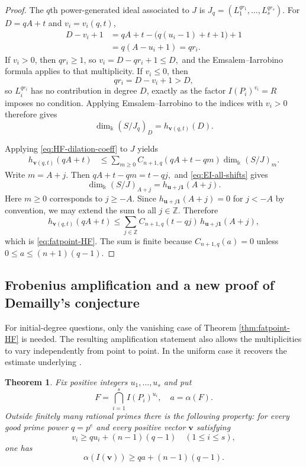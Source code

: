 \documentclass[11pt]{amsart}
\newtheorem{theorem}{Theorem}[section]
\theoremstyle{remark}
\newcommand{\kk}{\Bbbk}
\newcommand{\ZZ}{\mathbb Z}
\begin{document}
\begin{proof}
The $q$th power-generated ideal associated to $J$ is
$
J_q=(L_1^{qr_1},\ldots,L_s^{qr_s}).
$
For $D=qA+t$ and $v_i=v_i(q,t)$,
$$
\begin{aligned}
D-v_i+1
&=qA+t-\bigl(q(u_i-1)+t+1\bigr)+1\\
&=q(A-u_i+1) =qr_i.
\end{aligned}
$$
If $v_i>0$, then $qr_i\ge1$, so
$
v_i=D-qr_i+1\le D,
$
and the Emsalem--Iarrobino formula applies to that multiplicity. If $v_i\le0$, then
$$
qr_i=D-v_i+1>D,
$$
so $L_i^{qr_i}$ has no contribution in degree $D$, exactly as the factor $I(P_i)^{v_i}=R$ imposes no condition. Applying Emsalem--Iarrobino to the indices with $v_i>0$ therefore gives
$$
\dim_{\kk}(S/J_q)_D=h_{\mathbf v(q,t)}(D).
$$

Applying \eqref{eq:HF-dilation-coeff} to $J$ yields
$$
\begin{aligned}
h_{\mathbf v(q,t)}(qA+t)
&\le
\sum_{m\ge0}C_{n+1,q}(qA+t-qm)\dim_{\kk}(S/J)_m.
\end{aligned}
$$
Write $m=A+j$. Then
$
qA+t-qm=t-qj,
$
and \eqref{eq:EI-all-shifts} gives
$$
\dim_{\kk}(S/J)_{A+j}=h_{\mathbf u+j\mathbf1}(A+j).
$$
Here $m\ge0$ corresponds to $j\ge-A$. Since $h_{\mathbf u+j\mathbf1}(A+j)=0$ for $j<-A$ by convention, we may extend the sum to all $j\in\ZZ$. Therefore
$$
h_{\mathbf v(q,t)}(qA+t)
\le
\sum_{j\in\ZZ}
C_{n+1,q}(t-qj)
\,h_{\mathbf u+j\mathbf1}(A+j),
$$
which is \eqref{eq:fatpoint-HF}. The sum is finite because $C_{n+1,q}(a)=0$ unless $0\le a\le(n+1)(q-1)$.
\end{proof}

\subsection{Frobenius amplification and a new proof of Demailly's conjecture}

For initial-degree questions, only the vanishing case of Theorem \ref{thm:fatpoint-HF} is needed. The resulting amplification statement also allows the multiplicities to vary independently from point to point. In the uniform case it recovers the estimate underlying \cite[Theorem~3.8]{HaSivakumar}.

\begin{theorem}\label{thm:fatpoint-amp}
Fix positive integers $u_1,\ldots,u_s$ and put
$$
F=\bigcap_{i=1}^s I(P_i)^{u_i},
\quad
a=\alpha(F).
$$
Outside finitely many rational primes there is the following property: for every good prime power $q=p^e$ and every positive vector $\mathbf v$ satisfying
\begin{equation}\label{eq:target-mult}
v_i\ge qu_i+(n-1)(q-1)
\quad(1\le i\le s),
\end{equation}
one has
\begin{equation}\label{eq:fatpoint-amp}
\alpha(I(\mathbf v))
\ge
qa+(n-1)(q-1).
\end{equation}
\end{theorem}
\end{document}
